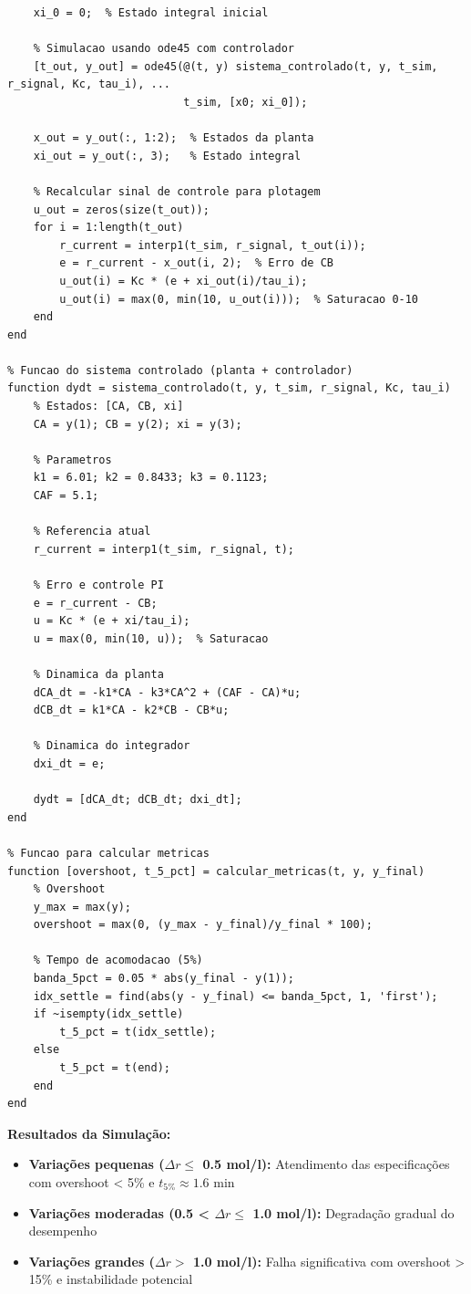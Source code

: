 \documentclass[a4paper,12pt]{article}
\begin{document}
\begin{lstlisting}[caption=Simulacao do controle PI em sistema nao linear]
    % Estados do controlador PI (integral)
    xi_0 = 0;  % Estado integral inicial
    
    % Simulacao usando ode45 com controlador
    [t_out, y_out] = ode45(@(t, y) sistema_controlado(t, y, t_sim, r_signal, Kc, tau_i), ...
                           t_sim, [x0; xi_0]);
    
    x_out = y_out(:, 1:2);  % Estados da planta
    xi_out = y_out(:, 3);   % Estado integral
    
    % Recalcular sinal de controle para plotagem
    u_out = zeros(size(t_out));
    for i = 1:length(t_out)
        r_current = interp1(t_sim, r_signal, t_out(i));
        e = r_current - x_out(i, 2);  % Erro de CB
        u_out(i) = Kc * (e + xi_out(i)/tau_i);
        u_out(i) = max(0, min(10, u_out(i)));  % Saturacao 0-10
    end
end

% Funcao do sistema controlado (planta + controlador)
function dydt = sistema_controlado(t, y, t_sim, r_signal, Kc, tau_i)
    % Estados: [CA, CB, xi]
    CA = y(1); CB = y(2); xi = y(3);
    
    % Parametros
    k1 = 6.01; k2 = 0.8433; k3 = 0.1123;
    CAF = 5.1;
    
    % Referencia atual
    r_current = interp1(t_sim, r_signal, t);
    
    % Erro e controle PI
    e = r_current - CB;
    u = Kc * (e + xi/tau_i);
    u = max(0, min(10, u));  % Saturacao
    
    % Dinamica da planta
    dCA_dt = -k1*CA - k3*CA^2 + (CAF - CA)*u;
    dCB_dt = k1*CA - k2*CB - CB*u;
    
    % Dinamica do integrador
    dxi_dt = e;
    
    dydt = [dCA_dt; dCB_dt; dxi_dt];
end

% Funcao para calcular metricas
function [overshoot, t_5_pct] = calcular_metricas(t, y, y_final)
    % Overshoot
    y_max = max(y);
    overshoot = max(0, (y_max - y_final)/y_final * 100);
    
    % Tempo de acomodacao (5%)
    banda_5pct = 0.05 * abs(y_final - y(1));
    idx_settle = find(abs(y - y_final) <= banda_5pct, 1, 'first');
    if ~isempty(idx_settle)
        t_5_pct = t(idx_settle);
    else
        t_5_pct = t(end);
    end
end
\end{lstlisting}

\textbf{Resultados da Simulação:}
\begin{itemize}
\item \textbf{Variações pequenas ($ \Delta r \leq$ 0.5 mol/l):} Atendimento das especificações com overshoot < 5\% e $t_{5\%} \approx 1.6$ min
\item \textbf{Variações moderadas (0.5 < $ \Delta r \leq$ 1.0 mol/l):} Degradação gradual do desempenho
\item \textbf{Variações grandes ($ \Delta r >$ 1.0 mol/l):} Falha significativa com overshoot > 15\% e instabilidade potencial
\end{itemize}
\end{document}
